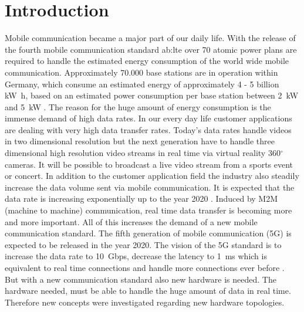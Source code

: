 \chapter{Introduction}
Mobile communication became a major part of our daily life. 
With the release of the fourth mobile communication standard  \gls{ab:lte} over 70 atomic power plans are required to handle the estimated energy consumption of the world wide mobile communication.
Approximately 70.000 base stations \cite{Bundesnetzagentur2016} are in operation within Germany, which consume an estimated energy of approximately 4 - 5 billion \si{\kilo \watt \hour}, based on an estimated power consumption per base station between \SI{2}{\kilo \watt} and \SI{5}{\kilo \watt} \cite{BaseStationEnergy}.
The reason for the huge amount of energy consumption is the immense demand of high data rates.
In our every day life customer applications are dealing with very high data transfer rates.
Today's data rates handle videos in two dimensional resolution but the next generation have to handle three dimensional high resolution video streams in real time via virtual reality 360$^{\circ}$ cameras.
It will be possible to broadcast a live video stream from a sports event or concert.
In addition to the customer application field the industry also steadily increase the data volume sent via mobile communication.
It is expected that the data rate is increasing exponentially up to the year 2020 \cite{BundesnetzagenturfuerElektrizitaet2015}. 
Induced by M2M (machine to machine) communication, real time data transfer is becoming more and more important.
All of this increases the demand of a new mobile communication standard.
The fifth generation of mobile communication (5G) is expected to be released in the year 2020.
The vision of the 5G standard is to increase the data rate to \SI{10}{Gbps}, decrease the latency to \SI{1}{\milli \second} which is equivalent to real time connections and handle more connections ever before \cite{EuropeanCommission2015}.
But with a new communication standard also new hardware is needed.
The hardware needed, must be able to handle the huge amount of data in real time.
Therefore new concepts were investigated regarding new hardware topologies.
